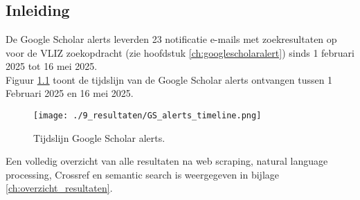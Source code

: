 
\chapter{}%
\label{ch:resultaten}

\section{Inleiding}
De Google Scholar alerts leverden 23 notificatie e-mails met zoekresultaten op voor de VLIZ zoekopdracht (zie hoofdstuk \ref{ch:googlescholaralert}) sinds 1 februari 2025 tot 16 mei 2025.\\
Figuur \ref{fig:GSAlertsTimeline} toont de tijdslijn van de Google Scholar alerts ontvangen tussen 1 Februari 2025 en 16 mei 2025.
\begin{figure}[h!]
    \centering
    \texttt{[image: ./9\_resultaten/GS\_alerts\_timeline.png]}
    \caption[Tijdslijn Google Scholar alerts.]{\label{fig:GSAlertsTimeline}Tijdslijn Google Scholar alerts.}
\end{figure}
Een volledig overzicht van alle resultaten na web scraping, natural language processing, Crossref en semantic search is weergegeven in bijlage \ref{ch:overzicht_resultaten}.

